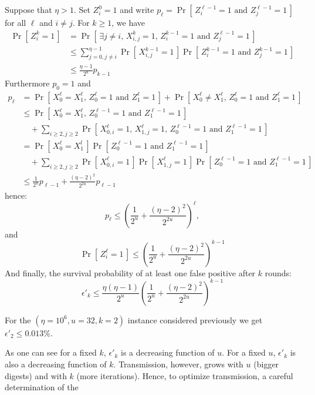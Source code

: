\documentclass[11pt]{llncs}
\newcommand{\Prob}[1]{{\Pr\left[\,{#1}\,\right]}}
\begin{document}
Suppose that $\eta > 1$.
Set $Z^0_i = 1$ and write $p_\ell = \Prob{Z^{\ell-1}_{i} = 1 \text{ and } Z^{\ell-1}_{j} = 1} $ for all $\ell$ and $i \neq j$.
For $k \ge 1$, we have
\begin{align*}
\Prob{Z^k_i=1} &= \Prob{\exists j\neq i \text{, } X^k_{i,j} = 1 \text{, } Z^{k-1}_{i} = 1  \text{ and } Z^{\ell-1}_{j} = 1}  \\
&\le \sum_{j=0, j\neq i}^{\eta-1} \Prob{X^{k-1}_{i,j} = 1} \Prob{Z^{k-1}_{i} = 1 \text{ and } Z^{k-1}_{j} = 1}  \\
&\le \frac{\eta-1}{2^u} p_{k-1}
\end{align*}
Furthermore $p_0 = 1$ and
\begin{align*}
p_\ell &= \Prob{X^{\ell}_0 = X^{\ell}_1 \text{, } Z^{\ell}_{0} = 1 \text{ and } Z^{\ell}_{1} = 1}
  + \Prob{X^{\ell}_0 \neq X^{\ell}_1 \text{, } Z^{\ell}_{0} = 1 \text{ and } Z^{\ell}_{1} = 1} \\
&\le \Prob{X^{\ell}_0 = X^{\ell}_1 \text{, } Z^{\ell-1}_{0} = 1 \text{ and } Z^{\ell-1}_{1} = 1} \\
  &\quad+ \sum_{i \ge 2, j \ge 2} \Prob{X^\ell_{0,i} = 1 \text{, } X^\ell_{1,j} = 1 \text{, } Z^{\ell-1}_{0} = 1 \text{ and } Z^{\ell-1}_{1} = 1} \\
&= \Prob{X^{\ell}_0 = X^{l}_1} \Prob{Z^{\ell-1}_{0} = 1 \text{ and } Z^{\ell-1}_{1} = 1} \\
  &\quad+ \sum_{i \ge 2, j \ge 2} \Prob{X^\ell_{0,i} = 1} \Prob{X^\ell_{1,j} = 1} \Prob{Z^{\ell-1}_{0} = 1 \text{ and } Z^{\ell-1}_{1} = 1} \\
&\le \frac{1}{2^u} p_{\ell-1} + \frac{(\eta-2)^2}{2^{2u}} p_{\ell-1}
\end{align*}
hence:
\[ p_\ell \le \left( \frac{1}{2^u} + \frac{(\eta-2)^2}{2^{2u}} \right)^\ell, \]
and
\[ \Prob{Z^\ell_i=1} \le \left( \frac{1}{2^u} + \frac{(\eta-2)^2}{2^{2u}} \right)^{k-1} \]
And finally, the survival probability of at least one false positive after $k$ rounds:
\[
\epsilon'_k \le \frac{\eta(\eta-1)}{2^u} \left( \frac{1}{2^u} + \frac{(\eta-2)^2}{2^{2u}} \right)^{k-1}
\]

For the $(\eta=10^6,u=32,k=2)$ instance considered previously we get $\epsilon'_2 \le 0.013\%$.\smallskip

As one can see for a fixed $k$, $\epsilon'_k$ is a decreasing function of $u$. For a fixed $u$, $\epsilon'_k$ is also a decreasing function of $k$. Transmission, however, grows with $u$ (bigger digests) and with $k$ (more iterations). Hence, to optimize transmission, a careful determination of the
\end{document}
